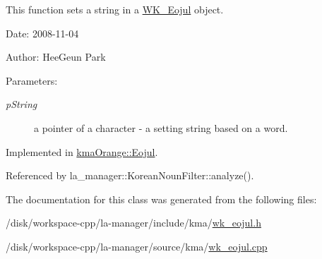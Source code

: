 This function sets a string in a \hyperlink{classWK__Eojul}{WK\_\-Eojul} object. 

\begin{Desc}
\item[Date:]2008-11-04 \end{Desc}
\begin{Desc}
\item[Author:]HeeGeun Park \end{Desc}
\begin{Desc}
\item[Parameters:]
\begin{description}
\item[{\em pString}]a pointer of a character - a setting string based on a word. \end{description}
\end{Desc}


Implemented in \hyperlink{classkmaOrange_1_1Eojul_5f553fa542efc366e13729c270cb5001}{kmaOrange::Eojul}.

Referenced by la\_\-manager::KoreanNounFilter::analyze().

The documentation for this class was generated from the following files:\begin{CompactItemize}
\item 
/disk/workspace-cpp/la-manager/include/kma/\hyperlink{wk__eojul_8h}{wk\_\-eojul.h}\item 
/disk/workspace-cpp/la-manager/source/kma/\hyperlink{wk__eojul_8cpp}{wk\_\-eojul.cpp}\end{CompactItemize}

